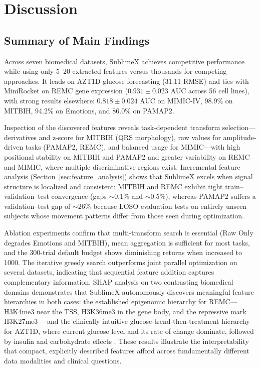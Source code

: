\documentclass[times, review, 10pt]{elsarticle}
\begin{document}
\section{Discussion}

\subsection{Summary of Main Findings}

Across seven biomedical datasets, SublimeX achieves competitive
performance while using only 5--20 extracted features versus
thousands for competing approaches. It leads on AZT1D glucose
forecasting (31.11 RMSE) and ties with MiniRocket on REMC gene
expression ($0.931 \pm 0.023$ AUC across 56 cell lines), with
strong results elsewhere: $0.818 \pm 0.024$ AUC on MIMIC-IV,
98.9\% on MITBIH, 94.2\% on Emotions, and 86.0\% on PAMAP2.

Inspection of the discovered features reveals task-dependent
transform selection---derivatives and z-score for MITBIH (QRS
morphology), raw values for amplitude-driven tasks (PAMAP2, REMC),
and balanced usage for MIMIC---with high positional stability on
MITBIH and PAMAP2 and greater variability on REMC and MIMIC, where
multiple discriminative regions exist. Incremental feature analysis
(Section~\ref{sec:feature_analysis}) shows that SublimeX excels
when signal structure is localized and consistent: MITBIH and REMC
exhibit tight train--validation--test convergence (gaps
${\sim}0.1\%$ and ${\sim}0.5\%$), whereas PAMAP2 suffers a
validation--test gap of ${\sim}26\%$ because LOSO evaluation tests
on entirely unseen subjects whose movement patterns differ from
those seen during optimization.

Ablation experiments confirm that multi-transform search is
essential (Raw Only degrades Emotions and MITBIH), mean aggregation
is sufficient for most tasks, and the 300-trial default budget
shows diminishing returns when increased to 1000. The iterative
greedy search outperforms joint parallel optimization on several
datasets, indicating that sequential feature addition captures
complementary information. SHAP analysis on two contrasting
biomedical domains demonstrates that SublimeX autonomously
discovers meaningful feature hierarchies in both cases: the
established epigenomic hierarchy for REMC---H3K4me3 near the
TSS, H3K36me3 in the gene body, and the repressive mark H3K27me3
\cite{karlic2010histone, howe2017h3k4me3}---and the clinically
intuitive glucose-trend-then-treatment hierarchy for AZT1D, where
current glucose level and its rate of change dominate, followed by
insulin and carbohydrate effects
\cite{khamesian2025azt1d}. These results illustrate the
interpretability that compact, explicitly described features
afford across fundamentally different data modalities and clinical
questions.
\end{document}

